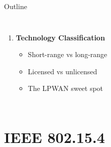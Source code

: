 \documentclass[aspectratio=169,11pt]{beamer}
\begin{document}
\begin{frame}{Outline}
\begin{columns}
\begin{enumerate}
            \item \textbf{Technology Classification}
            \begin{itemize}
                \item Short-range vs long-range
                \item Licensed vs unlicensed
                \item The LPWAN sweet spot
            \end{itemize}
        \end{enumerate}
    \end{columns}
\end{frame}

\section{IEEE 802.15.4}
\end{document}

